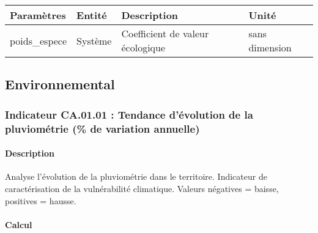 \documentclass[
]{article}
\begin{document}
\begin{longtable}[]{@{}
  >{\raggedright\arraybackslash}p{}
  >{\raggedright\arraybackslash}p{}
  >{\raggedright\arraybackslash}p{}
  >{\raggedright\arraybackslash}p{}@{}}
\toprule\noalign{}
\begin{minipage}[b]{\linewidth}\raggedright
\textbf{Paramètres}
\end{minipage} & \begin{minipage}[b]{\linewidth}\raggedright
\textbf{Entité}
\end{minipage} & \begin{minipage}[b]{\linewidth}\raggedright
\textbf{Description}
\end{minipage} & \begin{minipage}[b]{\linewidth}\raggedright
\textbf{Unité}
\end{minipage} \\
\midrule\noalign{}
\endhead
\bottomrule\noalign{}
\endlastfoot
poids\_espece & Système & Coefficient de valeur écologique & sans
dimension \\
\end{longtable}

\subsection{Environnemental}\label{environnemental}

\subsubsection{Indicateur CA.01.01 : Tendance d'évolution de la
pluviométrie (\% de variation
annuelle)}\label{indicateur-ca.01.01-tendance-duxe9volution-de-la-pluviomuxe9trie-de-variation-annuelle}

\paragraph{Description}\label{description-17}

Analyse l'évolution de la pluviométrie dans le territoire. Indicateur de
caractérisation de la vulnérabilité climatique. Valeurs négatives =
baisse, positives = hausse.

\paragraph{Calcul}\label{calcul-17}
\end{document}
